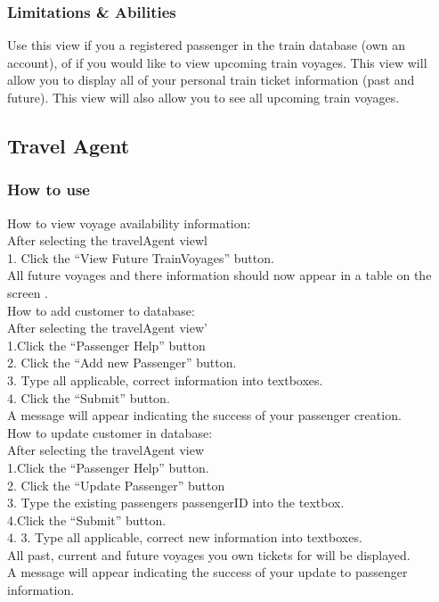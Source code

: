 \documentclass[letter]{article}
\begin{document}
\subsubsection{Limitations \& Abilities}
Use this view if you a registered passenger in the train database (own an account), of if you would like to view upcoming train voyages. This view will allow you to display all of your personal train ticket information (past and future).  This view will also allow you to see all upcoming train voyages.

\subsection{Travel Agent}
\subsubsection{How to use}

How to view voyage availability information:\\
After selecting the travelAgent viewl\\  
1. Click the “View Future TrainVoyages” button. \\
All future voyages and there information should now appear in a table on the screen .\\ 


How to add customer to database:\\
After selecting the travelAgent view'\\
1.Click the “Passenger Help” button\\
2. Click the “Add new Passenger” button. \\
3. Type all applicable, correct information into textboxes.\\
4. Click the “Submit” button.\\
A message will appear indicating the success of your passenger creation.\\


How to update customer in database:\\
After selecting the travelAgent view\\
1.Click the “Passenger Help” button.\\
2. Click the “Update Passenger” button\\
3. Type the existing passengers passengerID into the textbox.\\
4.Click the “Submit” button. \\
4. 3. Type all applicable, correct new information into textboxes.\\
All past, current and future voyages you own tickets for will be displayed. \\
A message will appear indicating the success of your update to passenger information.\\ 
\end{document}
